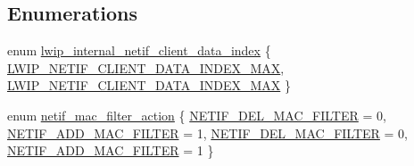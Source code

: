 \subsection*{Enumerations}
\begin{DoxyCompactItemize}
\item 
enum \hyperlink{openmote-cc2538_2lwip_2src_2include_2lwip_2netif_8h_a528ae27498af778f808a930469d98308}{lwip\+\_\+internal\+\_\+netif\+\_\+client\+\_\+data\+\_\+index} \{ \hyperlink{native_2lwip_2src_2include_2lwip_2netif_8h_a528ae27498af778f808a930469d98308a07e3221acd5d0c9890a999dbe7e03d38}{L\+W\+I\+P\+\_\+\+N\+E\+T\+I\+F\+\_\+\+C\+L\+I\+E\+N\+T\+\_\+\+D\+A\+T\+A\+\_\+\+I\+N\+D\+E\+X\+\_\+\+M\+AX}, 
\hyperlink{openmote-cc2538_2lwip_2src_2include_2lwip_2netif_8h_a528ae27498af778f808a930469d98308a07e3221acd5d0c9890a999dbe7e03d38}{L\+W\+I\+P\+\_\+\+N\+E\+T\+I\+F\+\_\+\+C\+L\+I\+E\+N\+T\+\_\+\+D\+A\+T\+A\+\_\+\+I\+N\+D\+E\+X\+\_\+\+M\+AX}
 \}
\item 
enum \hyperlink{openmote-cc2538_2lwip_2src_2include_2lwip_2netif_8h_ab194ec4241fad8b6e9aac51e3ec23de0}{netif\+\_\+mac\+\_\+filter\+\_\+action} \{ \hyperlink{native_2lwip_2src_2include_2lwip_2netif_8h_ab194ec4241fad8b6e9aac51e3ec23de0a7ad3406353906deb4e64ebeed349e07e}{N\+E\+T\+I\+F\+\_\+\+D\+E\+L\+\_\+\+M\+A\+C\+\_\+\+F\+I\+L\+T\+ER} = 0, 
\hyperlink{native_2lwip_2src_2include_2lwip_2netif_8h_ab194ec4241fad8b6e9aac51e3ec23de0a4186fbaf94be956ea1a3b02cd1cccb1f}{N\+E\+T\+I\+F\+\_\+\+A\+D\+D\+\_\+\+M\+A\+C\+\_\+\+F\+I\+L\+T\+ER} = 1, 
\hyperlink{openmote-cc2538_2lwip_2src_2include_2lwip_2netif_8h_ab194ec4241fad8b6e9aac51e3ec23de0a7ad3406353906deb4e64ebeed349e07e}{N\+E\+T\+I\+F\+\_\+\+D\+E\+L\+\_\+\+M\+A\+C\+\_\+\+F\+I\+L\+T\+ER} = 0, 
\hyperlink{openmote-cc2538_2lwip_2src_2include_2lwip_2netif_8h_ab194ec4241fad8b6e9aac51e3ec23de0a4186fbaf94be956ea1a3b02cd1cccb1f}{N\+E\+T\+I\+F\+\_\+\+A\+D\+D\+\_\+\+M\+A\+C\+\_\+\+F\+I\+L\+T\+ER} = 1
 \}
\end{DoxyCompactItemize}
